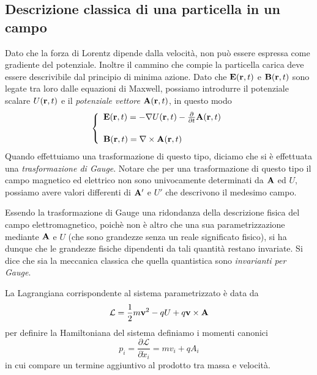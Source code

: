 \subsection{Descrizione classica di una particella in un campo}

Dato che la forza di Lorentz dipende dalla velocit\`a, non pu\`o essere espressa come gradiente del potenziale. Inoltre il cammino che compie la particella carica deve essere descrivibile dal principio di minima azione. Dato che $\bold{E}(\bold{r},t)$ e $\bold{B}(\bold{r},t)$ sono legate tra loro dalle equazioni di Maxwell, possiamo introdurre il potenziale scalare $U(\bold{r},t)$ e il \textit{potenziale vettore} $\bold{A}(\bold{r},t)$, in questo modo 
\begin{equation*}
	\left \{ \begin{array}{l}
		\bold{E}(\bold{r},t) = - \nabla U(\bold{r},t) - \frac{\partial}{\partial t}\bold{A}(\bold{r},t)\\[0.5cm]
		\bold{B}(\bold{r},t) = \nabla \times \bold{A}(\bold{r},t)
	\end{array}\right.
\end{equation*}
Quando effettuiamo una trasformazione di questo tipo, diciamo che si \`e effettuata una \textit{trasformazione di Gauge}. Notare che per una trasformazione di questo tipo il campo magnetico ed elettrico non sono univocamente determinati da $\bold{A}$ ed $U$, possiamo avere 
	valori differenti di $\bold{A}'$ e $U'$ che descrivono il medesimo campo.

Essendo la trasformazione di Gauge una ridondanza della descrizione fisica del campo elettromagnetico, poich\`e non \`e altro che una sua parametrizzazione mediante $\bold{A}$ e $U$ (che sono grandezze senza un reale significato fisico), si ha dunque che le grandezze fisiche dipendenti da tali quantit\`a restano invariate. Si dice che sia la meccanica classica che quella quantistica sono \textit{invarianti per Gauge}.
	
La  Lagrangiana corrispondente al sistema parametrizzato \`e data da
\begin{equation*}
	\mathcal{L} = \frac{1}{2}m \bold{v}^2 - qU + q\bold{v} \times \bold{A} 
\end{equation*}
per definire la Hamiltoniana del sistema definiamo i momenti canonici 
\begin{equation}
	p_i = \frac{\partial \mathcal{L}}{\partial \dot{x}_i} = mv_i + qA_i
\end{equation}
in cui compare un termine aggiuntivo al prodotto tra massa e velocit\`a. 
\newpage
 
